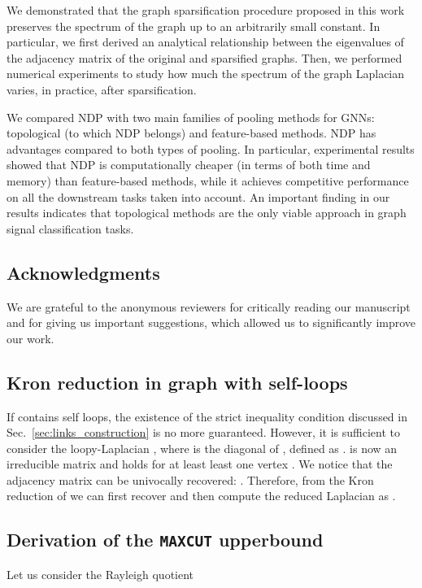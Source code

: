 \documentclass[journal]{IEEEtran}
\newcommand{\maxcut}{\texttt{\small{MAXCUT}}}
\begin{document}
We demonstrated that the graph sparsification procedure proposed in this work preserves the spectrum of the graph up to an arbitrarily small constant.
In particular, we first derived an analytical relationship between the eigenvalues of the adjacency matrix of the original and sparsified graphs.
Then, we performed numerical experiments to study how much the spectrum of the graph Laplacian varies, in practice, after sparsification.

We compared NDP with two main families of pooling methods for GNNs: topological (to which NDP belongs) and feature-based methods.
NDP has advantages compared to both types of pooling. 
In particular, experimental results showed that NDP is computationally cheaper (in terms of both time and memory) than feature-based methods, while it achieves competitive performance on all the downstream tasks taken into account. 
An important finding in our results indicates that topological methods are the only viable approach in graph signal classification tasks.

\subsection*{Acknowledgments}
We are grateful to the anonymous reviewers for critically reading our manuscript and for giving us important suggestions, which allowed us to significantly improve our work.

\appendix

\subsection{Kron reduction in graph with self-loops}
\label{sec:kron_loops}
If  contains self loops, the existence of the strict inequality condition  discussed in Sec.~\ref{sec:links_construction} is no more guaranteed.
However, it is sufficient to consider the loopy-Laplacian , where  is the diagonal of , defined as .
 is now an irreducible matrix and  holds for at least least one vertex .
We notice that the adjacency matrix can be univocally recovered: .
Therefore, from the Kron reduction  of  we can first recover  and then compute the reduced Laplacian as .

\subsection{Derivation of the \maxcut{} upperbound}
\label{sec:upperbound_derivation}
Let us consider the Rayleigh quotient
\end{document}
